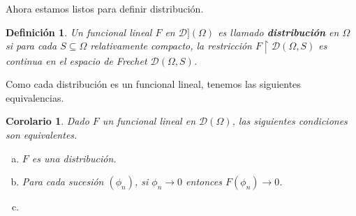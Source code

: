 \documentclass[letter,12pt]{article}
\newtheorem{definition}{Definición}
\newtheorem{corollary}[theorem]{Corolario}
\begin{document}
Ahora estamos listos para definir distribución.

\begin{definition}\normalfont
	Un funcional lineal $ F $ en $ \mathscr{D}](\Omega) $ es llamado
	\textbf{distribución} en $ \Omega $ si para cada $ S\subseteq\Omega $ relativamente
	compacto, la restricción $ F\restriction{\mathscr{D}(\Omega, S)} $ es continua en
	el espacio de Frechet $ \mathscr{D}(\Omega, S) $.
\end{definition}

Como cada distribución es un funcional lineal, tenemos las siguientes equivalencias.
\begin{corollary}\normalfont
	Dado $ F $ un funcional lineal en $ \mathscr{D}(\Omega) $, las siguientes
	condiciones son equivalentes.
	\begin{enumerate}[(a)]
		\item $ F $ es una distribución.
		\item Para cada sucesión $ (\phi_n) $, si $ \phi_n \to 0 $ entonces
		$ F(\phi_n) \to 0 $.
		\item 
	\end{enumerate}
\end{corollary}

\cite{Rudin}
\cite{Edwards}
\cite{Halperin}
\cite{Strichartz}
\printbibliography
\end{document}
